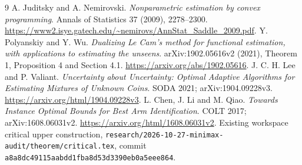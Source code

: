 \documentclass[11pt]{article}
\begin{document}
\begin{thebibliography}{9}
 A. Juditsky and A. Nemirovski.
\emph{Nonparametric estimation by convex programming}.
Annals of Statistics 37 (2009), 2278--2300.
\url{https://www2.isye.gatech.edu/~nemirovs/AnnStat_Saddle_2009.pdf}.
 Y. Polyanskiy and Y. Wu.
\emph{Dualizing Le Cam's method for functional estimation, with applications
to estimating the unseens}. arXiv:1902.05616v2 (2021), Theorem 1,
Proposition 4 and Section 4.1.
\url{https://arxiv.org/abs/1902.05616}.
 J. C. H. Lee and P. Valiant.
\emph{Uncertainty about Uncertainty: Optimal Adaptive Algorithms for
Estimating Mixtures of Unknown Coins}. SODA 2021; arXiv:1904.09228v3.
\url{https://arxiv.org/html/1904.09228v3}.
 L. Chen, J. Li and M. Qiao.
\emph{Towards Instance Optimal Bounds for Best Arm Identification}.
COLT 2017; arXiv:1608.06031v2.
\url{https://arxiv.org/html/1608.06031v2}.
 Existing workspace critical upper construction,
\texttt{research/2026-10-27-minimax-audit/theorem/critical.tex},
commit \texttt{a8a8dc49115aabdd1fba8d53d3390eb0a5eee864}.
\end{thebibliography}
\end{document}
